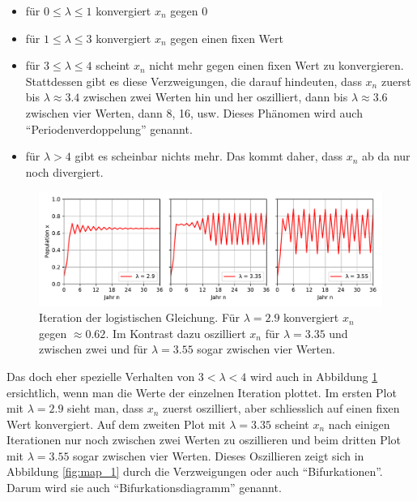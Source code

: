 \begin{itemize}
    \item 
    für $0 \le \lambda \le 1$ konvergiert $x_n$ gegen 0
    \item 
    für $1 \le \lambda \le 3$ konvergiert $x_n$ gegen einen fixen Wert
    \item 
    für $3 \le \lambda \le 4$ scheint $x_n$ nicht mehr gegen einen fixen Wert zu konvergieren.
    Stattdessen gibt es diese Verzweigungen, 
%
    die darauf hindeuten, 
    dass $x_n$ zuerst bis $\lambda \approx 3.4$ zwischen zwei Werten hin und her oszilliert, 
    dann bis $\lambda \approx 3.6$ zwischen vier Werten, dann 8, 16, usw. 
    Dieses Phänomen wird auch ``Periodenverdoppelung'' genannt.
%
    \item
    für $\lambda > 4$ gibt es scheinbar nichts mehr.
    Das kommt daher, dass $x_n$ ab da nur noch divergiert.  
\end{itemize}
\begin{figure}
    \includegraphics[width=\linewidth]{papers/logistic/figures/pop_logistic_2.pdf}
    \caption{
        Iteration der logistischen Gleichung. 
        Für $\lambda = 2.9$ konvergiert $x_n$ gegen
        $\approx 0.62$.
        Im Kontrast dazu oszilliert $x_n$ für
        $\lambda = 3.35$ und zwischen zwei 
        und für
        $\lambda = 3.55$ sogar zwischen vier Werten. 
    }
    \label{fig:pop_logistic_2}
\end{figure}
Das doch eher spezielle Verhalten von $3 < \lambda < 4$ wird 
auch in Abbildung \ref{fig:pop_logistic_2} ersichtlich,
wenn man die Werte der einzelnen Iteration plottet.
Im ersten Plot mit $\lambda = 2.9$ sieht man, dass $x_n$ zuerst oszilliert,
aber schliesslich auf einen fixen Wert konvergiert.
Auf dem zweiten Plot mit $\lambda = 3.35$ scheint $x_n$ 
nach einigen Iterationen nur noch
zwischen zwei Werten zu oszillieren und beim
dritten Plot mit $\lambda = 3.55$ sogar zwischen vier Werten. 
Dieses Oszillieren zeigt sich in Abbildung \ref{fig:map_1}
durch die Verzweigungen oder auch ``Bifurkationen''. 
%
%
Darum wird sie auch ``Bifurkationsdiagramm'' genannt. 

